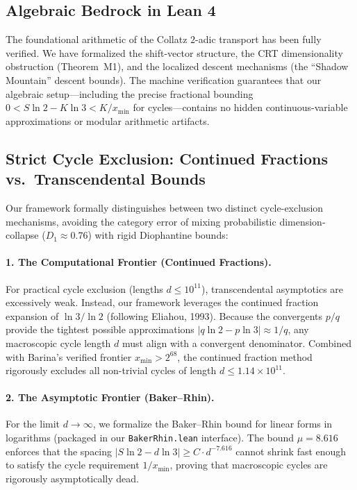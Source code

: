 \documentclass[12pt,a4paper]{article}
\theoremstyle{remark}
\begin{document}
\subsection{Algebraic Bedrock in Lean 4}
The foundational arithmetic of the Collatz $2$-adic transport has been fully verified. We have formalized the shift-vector structure, the CRT dimensionality obstruction (Theorem~M1), and the localized descent mechanisms (the ``Shadow Mountain'' descent bounds). The machine verification guarantees that our algebraic setup---including the precise fractional bounding $0 < S \ln 2 - K \ln 3 < K / x_{\mathrm{min}}$ for cycles---contains no hidden continuous-variable approximations or modular arithmetic artifacts.

\subsection{Strict Cycle Exclusion: Continued Fractions vs.\ Transcendental Bounds}
Our framework formally distinguishes between two distinct cycle-exclusion mechanisms, avoiding the category error of mixing probabilistic dimension-collapse ($D_1 \approx 0.76$) with rigid Diophantine bounds:

\paragraph{1. The Computational Frontier (Continued Fractions).}
For practical cycle exclusion (lengths $d \le 10^{11}$), transcendental asymptotics are excessively weak. Instead, our framework leverages the continued fraction expansion of $\ln 3 / \ln 2$ (following Eliahou, 1993). Because the convergents $p/q$ provide the tightest possible approximations $|q \ln 2 - p \ln 3| \approx 1/q$, any macroscopic cycle length $d$ must align with a convergent denominator. Combined with Barina's verified frontier $x_{\mathrm{min}} > 2^{68}$, the continued fraction method rigorously excludes all non-trivial cycles of length $d \le 1.14 \times 10^{11}$.

\paragraph{2. The Asymptotic Frontier (Baker--Rhin).}
For the limit $d \to \infty$, we formalize the Baker--Rhin bound for linear forms in logarithms (packaged in our \texttt{BakerRhin.lean} interface). The bound $\mu = 8.616$ enforces that the spacing $|S \ln 2 - d \ln 3| \ge C \cdot d^{-7.616}$ cannot shrink fast enough to satisfy the cycle requirement $1/x_{\mathrm{min}}$, proving that macroscopic cycles are rigorously asymptotically dead.
\end{document}
